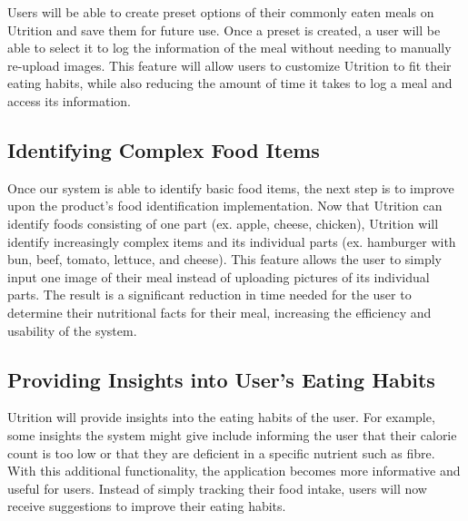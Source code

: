 \documentclass{article}
\begin{document}
Users will be able to create preset options of their commonly eaten meals on Utrition 
and save them for future use. Once a preset is created, a user will be able to 
select it to log the information of the meal without needing to manually 
re-upload images. This feature will allow users to customize Utrition to fit 
their eating habits, while also reducing the amount of time it takes to log a 
meal and access its information.

\subsection{Identifying Complex Food Items}

Once our system is able to identify basic food items, the next step is to improve upon the product's food identification implementation. Now that Utrition can identify foods consisting of one part (ex. apple, cheese, chicken), Utrition will identify increasingly complex items and its individual parts (ex. hamburger with bun, beef, tomato, lettuce, and cheese). This feature allows the user to simply input one image of their meal instead of uploading pictures of its individual parts. The result is a significant reduction in time needed for the user to determine their nutritional facts for their meal, increasing the efficiency and usability of the system.

\subsection{Providing Insights into User's Eating Habits}

Utrition will provide insights into the eating habits of the user. For example, some insights the system might give include informing the user that their calorie count is too low or that they are deficient in a specific nutrient such as fibre. With this additional functionality, the application becomes more informative and useful for users. Instead of simply tracking their food intake, users will now receive suggestions to improve their eating habits.
\end{document}
